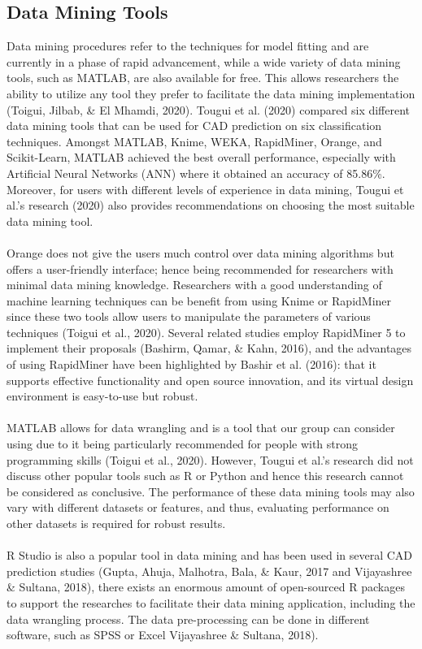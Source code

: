 \documentclass[a4paper, 12pt]{article}
\begin{document}
    \subsection{Data Mining Tools}
    Data mining procedures refer to the techniques for model fitting and are currently in a phase of rapid advancement, while a wide variety of data mining tools, such as MATLAB, are also available for free. This allows researchers the ability to utilize any tool they prefer to facilitate the data mining implementation (Toigui, Jilbab, \& El Mhamdi, 2020). Tougui et al. (2020) compared six different data mining tools that can be used for CAD prediction on six classification techniques. Amongst MATLAB, Knime, WEKA, RapidMiner, Orange, and Scikit-Learn, MATLAB achieved the best overall performance, especially with Artificial Neural Networks (ANN) where it obtained an accuracy of 85.86\%. Moreover, for users with different levels of experience in data mining, Tougui et al.’s research (2020) also provides recommendations on choosing the most suitable data mining tool. 
    \\\\
    Orange does not give the users much control over data mining algorithms but offers a user-friendly interface; hence being recommended for researchers with minimal data mining knowledge. Researchers with a good understanding of machine learning techniques can be benefit from using Knime or RapidMiner since these two tools allow users to manipulate the parameters of various techniques (Toigui et al., 2020). Several related studies employ RapidMiner 5 to implement their proposals (Bashirm, Qamar, \& Kahn, 2016), and the advantages of using RapidMiner have been highlighted by Bashir et al. (2016): that it supports effective functionality and open source innovation, and its virtual design environment is easy-to-use but robust.
    \\\\
    MATLAB allows for data wrangling and is a tool that our group can consider using due to it being particularly recommended for people with strong programming skills (Toigui et al., 2020). However, Tougui et al.’s research did not discuss other popular tools such as R or Python and hence this research cannot be considered as conclusive. The performance of these data mining tools may also vary with different datasets or features, and thus, evaluating performance on other datasets is required for robust results. 
    \\\\
    R Studio is also a popular tool in data mining and has been used in several CAD prediction studies (Gupta, Ahuja, Malhotra, Bala, \& Kaur, 2017 and Vijayashree \& Sultana, 2018), there exists an enormous amount of open-sourced R packages to support the researches to facilitate their data mining application, including the data wrangling process. The data pre-processing can be done in different software, such as SPSS or Excel Vijayashree \& Sultana, 2018).
\end{document}
